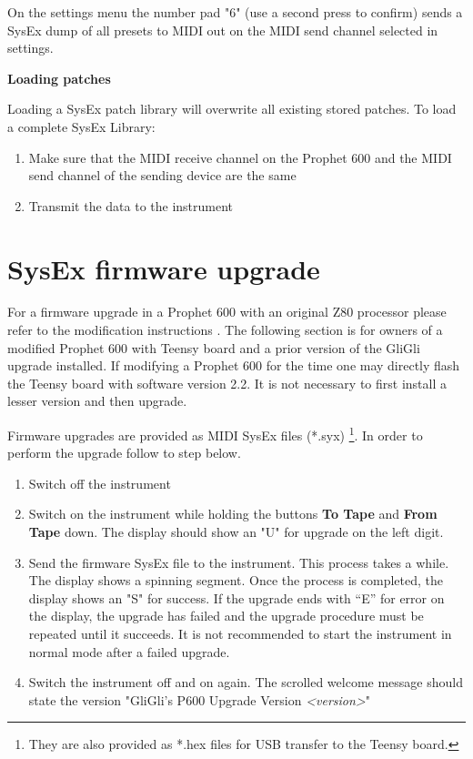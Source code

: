 \documentclass[draft,landscape, 11pt, oneside]{report}
\newenvironment{flowtext}{\addmargin[0cm]{7cm}}{\endaddmargin} %
\begin{document}
\begin{flowtext}
On the settings menu the number pad "6" (use a second press to confirm) sends a SysEx dump of all presets to MIDI out on the MIDI send channel selected in settings.

\textbf{Loading patches} 

Loading a SysEx patch library will overwrite all existing stored patches. To load a complete SysEx Library:

\begin{enumerate}
  \item Make sure that the MIDI receive channel on the Prophet 600 and the MIDI send channel of the sending device are the same
  \item Transmit the data to the instrument   
\end{enumerate}

\section{SysEx firmware upgrade}\label{fwupgrade}

For a firmware upgrade in a Prophet 600 with an original Z80 processor please refer to the modification instructions \cite{modinstructions}. The following section is for owners of a modified Prophet 600 with Teensy board and a prior version of the GliGli upgrade installed. If modifying a Prophet 600 for the time one may directly flash the Teensy board with software version 2.2. It is not necessary to first install a lesser version and then upgrade.

Firmware upgrades are provided as MIDI SysEx files (*.syx) \footnote{They are also provided as *.hex files for USB transfer to the Teensy board.}. In order to perform the upgrade follow to step below.

\begin{enumerate}
  \setlength\itemsep{0cm}
  \item Switch off the instrument
  \item Switch on the instrument while holding the buttons \textbf{To Tape} and \textbf{From Tape} down. The display should show an "U" for upgrade on the left digit.
  \item Send the firmware SysEx file to the instrument. This process takes a while. The display shows a spinning segment. Once the process is completed, the display shows an "S" for success. If the upgrade ends with “E” for error on the display, the upgrade has failed and the upgrade procedure must be repeated until it succeeds. It is not recommended to start the instrument in normal mode after a failed upgrade.
  \item Switch the instrument off and on again. The scrolled welcome message should state the version "GliGli's P600 Upgrade Version \textit{<version>}"
\end{enumerate}


\end{flowtext}
\end{document}

